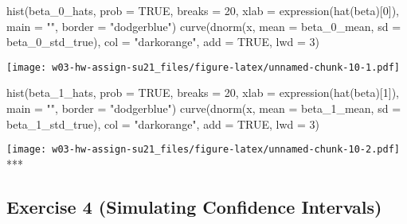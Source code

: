 \documentclass[
]{article}
\newenvironment{Shaded}{\begin{snugshade}}{\end{snugshade}}
\newcommand{\AttributeTok}[1]{\textcolor[rgb]{0.77,0.63,0.00}{#1}}
\newcommand{\ConstantTok}[1]{\textcolor[rgb]{0.00,0.00,0.00}{#1}}
\newcommand{\DecValTok}[1]{\textcolor[rgb]{0.00,0.00,0.81}{#1}}
\newcommand{\FunctionTok}[1]{\textcolor[rgb]{0.00,0.00,0.00}{#1}}
\newcommand{\NormalTok}[1]{#1}
\newcommand{\StringTok}[1]{\textcolor[rgb]{0.31,0.60,0.02}{#1}}
\begin{document}
\begin{Shaded}
\begin{Highlighting}[]
\FunctionTok{hist}\NormalTok{(beta\_0\_hats, }\AttributeTok{prob =} \ConstantTok{TRUE}\NormalTok{, }\AttributeTok{breaks =} \DecValTok{20}\NormalTok{, }
     \AttributeTok{xlab =} \FunctionTok{expression}\NormalTok{(}\FunctionTok{hat}\NormalTok{(beta)[}\DecValTok{0}\NormalTok{]), }\AttributeTok{main =} \StringTok{""}\NormalTok{, }\AttributeTok{border =} \StringTok{"dodgerblue"}\NormalTok{)}
\FunctionTok{curve}\NormalTok{(}\FunctionTok{dnorm}\NormalTok{(x, }\AttributeTok{mean =}\NormalTok{ beta\_0\_mean, }\AttributeTok{sd =}\NormalTok{ beta\_0\_std\_true), }
      \AttributeTok{col =} \StringTok{"darkorange"}\NormalTok{, }\AttributeTok{add =} \ConstantTok{TRUE}\NormalTok{, }\AttributeTok{lwd =} \DecValTok{3}\NormalTok{)}
\end{Highlighting}
\end{Shaded}

\texttt{[image: w03-hw-assign-su21\_files/figure-latex/unnamed-chunk-10-1.pdf]}

\begin{Shaded}
\begin{Highlighting}[]
\FunctionTok{hist}\NormalTok{(beta\_1\_hats, }\AttributeTok{prob =} \ConstantTok{TRUE}\NormalTok{, }\AttributeTok{breaks =} \DecValTok{20}\NormalTok{, }
     \AttributeTok{xlab =} \FunctionTok{expression}\NormalTok{(}\FunctionTok{hat}\NormalTok{(beta)[}\DecValTok{1}\NormalTok{]), }\AttributeTok{main =} \StringTok{""}\NormalTok{, }\AttributeTok{border =} \StringTok{"dodgerblue"}\NormalTok{)}
\FunctionTok{curve}\NormalTok{(}\FunctionTok{dnorm}\NormalTok{(x, }\AttributeTok{mean =}\NormalTok{ beta\_1\_mean, }\AttributeTok{sd =}\NormalTok{ beta\_1\_std\_true), }
      \AttributeTok{col =} \StringTok{"darkorange"}\NormalTok{, }\AttributeTok{add =} \ConstantTok{TRUE}\NormalTok{, }\AttributeTok{lwd =} \DecValTok{3}\NormalTok{)}
\end{Highlighting}
\end{Shaded}

\texttt{[image: w03-hw-assign-su21\_files/figure-latex/unnamed-chunk-10-2.pdf]}
***

\hypertarget{exercise-4-simulating-confidence-intervals}{%
\subsection{Exercise 4 (Simulating Confidence
Intervals)}\label{exercise-4-simulating-confidence-intervals}}
\end{document}
